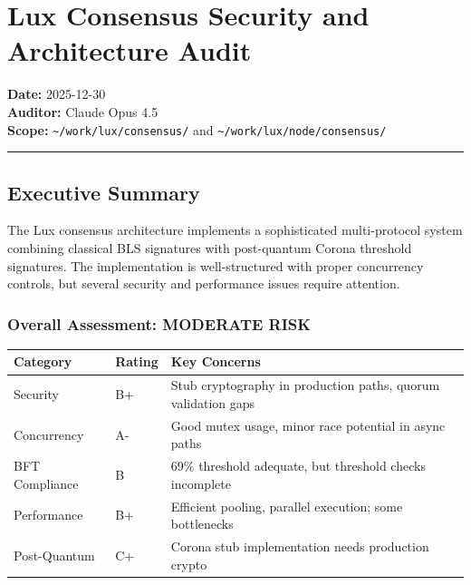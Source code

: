 \documentclass[
]{article}
\author{}
\date{}
\newcounter{none} %
\begin{document}
\section{Lux Consensus Security and Architecture
Audit}\label{lux-consensus-security-and-architecture-audit}

\textbf{Date:} 2025-12-30\\
\textbf{Auditor:} Claude Opus 4.5\\
\textbf{Scope:} \texttt{\textasciitilde{}/work/lux/consensus/} and
\texttt{\textasciitilde{}/work/lux/node/consensus/}

\begin{center}\rule{0.5\linewidth}{0.5pt}\end{center}

\subsection{Executive Summary}\label{executive-summary}

The Lux consensus architecture implements a sophisticated multi-protocol
system combining classical BLS signatures with post-quantum Corona
threshold signatures. The implementation is well-structured with proper
concurrency controls, but several security and performance issues
require attention.

\subsubsection{\texorpdfstring{Overall Assessment: \textbf{MODERATE
RISK}}{Overall Assessment: MODERATE RISK}}\label{overall-assessment-moderate-risk}

{\def\LTcaptype{none} %
\begin{longtable}[]{@{}lll@{}}
\toprule\noalign{}
Category & Rating & Key Concerns \\
\midrule\noalign{}
\endhead
\bottomrule\noalign{}
\endlastfoot
Security & B+ & Stub cryptography in production paths, quorum validation
gaps \\
Concurrency & A- & Good mutex usage, minor race potential in async
paths \\
BFT Compliance & B & 69\% threshold adequate, but threshold checks
incomplete \\
Performance & B+ & Efficient pooling, parallel execution; some
bottlenecks \\
Post-Quantum & C+ & Corona stub implementation needs production
crypto \\
\end{longtable}
}
\end{document}
